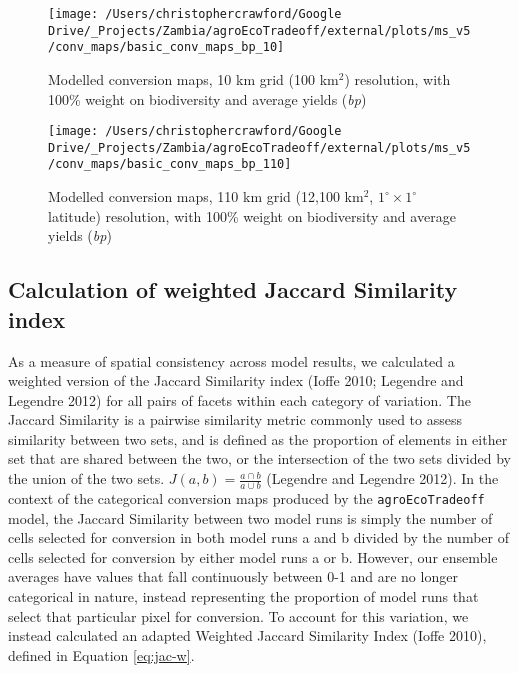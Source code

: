 \documentclass[
]{article}
\begin{document}
\begin{figure}
\texttt{[image: /Users/christophercrawford/Google Drive/\_Projects/Zambia/agroEcoTradeoff/external/plots/ms\_v5/conv\_maps/basic\_conv\_maps\_bp\_10]} \caption{Modelled conversion maps, 10 km grid (100 km\(^2\)) resolution, with 100\% weight on biodiversity and average yields (\emph{bp})}\label{fig:conv-maps-10-bp}
\end{figure}

\begin{figure}
\texttt{[image: /Users/christophercrawford/Google Drive/\_Projects/Zambia/agroEcoTradeoff/external/plots/ms\_v5/conv\_maps/basic\_conv\_maps\_bp\_110]} \caption{Modelled conversion maps, 110 km grid (12,100 km\(^2\), \(1^{\circ}\times1^{\circ}\) latitude) resolution, with 100\% weight on biodiversity and average yields (\emph{bp})}\label{fig:conv-maps-110-bp}
\end{figure}

\newpage

\hypertarget{calculation-of-weighted-jaccard-similarity-index}{%
\subsection{Calculation of weighted Jaccard Similarity index}\label{calculation-of-weighted-jaccard-similarity-index}}

As a measure of spatial consistency across model results, we calculated a weighted version of the Jaccard Similarity index (Ioffe 2010; Legendre and Legendre 2012) for all pairs of facets within each category of variation. The Jaccard Similarity is a pairwise similarity metric commonly used to assess similarity between two sets, and is defined as the proportion of elements in either set that are shared between the two, or the intersection of the two sets divided by the union of the two sets. \(J(a,b) = \frac{a\cap b}{a\cup b}\) (Legendre and Legendre 2012). In the context of the categorical conversion maps produced by the \texttt{agroEcoTradeoff} model, the Jaccard Similarity between two model runs is simply the number of cells selected for conversion in both model runs a and b divided by the number of cells selected for conversion by either model runs a or b. However, our ensemble averages have values that fall continuously between 0-1 and are no longer categorical in nature, instead representing the proportion of model runs that select that particular pixel for conversion. To account for this variation, we instead calculated an adapted Weighted Jaccard Similarity Index (Ioffe 2010), defined in Equation \eqref{eq:jac-w}.
\end{document}
